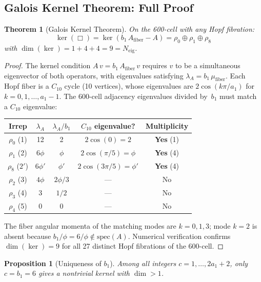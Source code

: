 \documentclass[12pt,a4paper]{article}
\newtheorem{theorem}{Theorem}
\newtheorem{proposition}{Proposition}
\theoremstyle{definition}
\begin{document}
\subsection{Galois Kernel Theorem: Full Proof}

\begin{theorem}[Galois Kernel Theorem]\label{thm:S-galois-kernel}
On the 600-cell with any Hopf fibration:
\begin{equation}
\ker(\Box) = \ker(b_1\,A_{\mathrm{fiber}} - A) = \rho_0 \oplus \rho_1 \oplus \rho_8
\end{equation}
with $\dim(\ker) = 1 + 4 + 4 = 9 = N_{\mathrm{eig}}$.
\end{theorem}

\begin{proof}
The kernel condition $A\,v = b_1\,A_{\text{fiber}}\,v$ requires $v$ to be a simultaneous eigenvector of both operators, with eigenvalues satisfying $\lambda_A = b_1\,\mu_{\text{fiber}}$.  Each Hopf fiber is a $C_{10}$ cycle (10 vertices), whose eigenvalues are $2\cos(k\pi/a_1)$ for $k = 0, 1, \ldots, a_1 - 1$.  The 600-cell adjacency eigenvalues divided by~$b_1$ must match a $C_{10}$ eigenvalue:

\begin{center}
\begin{tabular}{ccccc}
\toprule
Irrep & $\lambda_A$ & $\lambda_A / b_1$ & $C_{10}$ eigenvalue? & Multiplicity \\
\midrule
$\rho_0$ (1) & 12 & 2 & $2\cos(0) = 2$ & \textbf{Yes} (1) \\
$\rho_1$ (2) & $6\phi$ & $\phi$ & $2\cos(\pi/5) = \phi$ & \textbf{Yes} (4) \\
$\rho_8$ ($2'$) & $6\phi'$ & $\phi'$ & $2\cos(3\pi/5) = \phi'$ & \textbf{Yes} (4) \\
\midrule
$\rho_2$ (3) & $4\phi$ & $2\phi/3$ & --- & No \\
$\rho_3$ (4) & 3 & $1/2$ & --- & No \\
$\rho_4$ (5) & 0 & 0 & --- & No \\
\bottomrule
\end{tabular}
\end{center}
The fiber angular momenta of the matching modes are $k = 0, 1, 3$; mode $k = 2$ is absent because $b_1/\phi = 6/\phi \notin \text{spec}(A)$.  Numerical verification confirms $\dim(\ker) = 9$ for all 27 distinct Hopf fibrations of the 600-cell.
\end{proof}

\begin{proposition}[Uniqueness of $b_1$]\label{prop:S-b1-unique}
Among all integers $c = 1, \ldots, 2a_1 + 2$, only $c = b_1 = 6$ gives a nontrivial kernel with $\dim > 1$.
\end{proposition}
\end{document}
